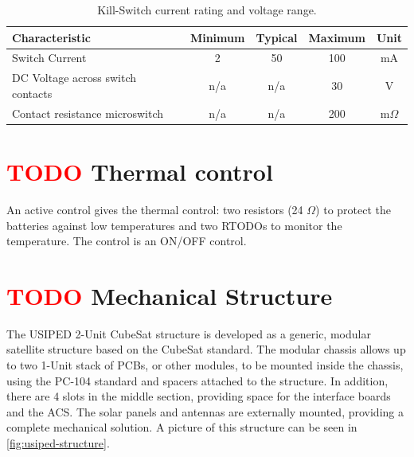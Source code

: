 \begin{table}[!h]
    \centering
    \begin{tabular}{lcccc}
        \toprule[1.5pt]
        \textbf{Characteristic} & \textbf{Minimum} & \textbf{Typical} & \textbf{Maximum} & \textbf{Unit} \\
        \midrule
        Switch Current                      & 2     & 50    & 100   & mA \\
        DC Voltage across switch contacts   & n/a   & n/a   & 30    & V \\
        Contact resistance microswitch      & n/a   & n/a   & 200   & m$\Omega$ \\
        \bottomrule[1.5pt]
    \end{tabular}
    \caption{Kill-Switch current rating and voltage range.}
    \label{tab:kill-switch-specs}
\end{table}


\section{ \textcolor{red}{TODO} Thermal control}

An active control gives the thermal control: two resistors (24 $\Omega$) to protect the batteries against low temperatures and two RTODOs to monitor the temperature. The control is an ON/OFF control.



\section{ \textcolor{red}{TODO} Mechanical Structure}

The USIPED 2-Unit CubeSat structure is developed as a generic, modular satellite structure based on the CubeSat standard. The modular chassis allows up to two 1-Unit stack of PCBs, or other modules, to be mounted inside the chassis, using the PC-104 standard and spacers attached to the structure. In addition, there are 4 slots in the middle section, providing space for the interface boards and the ACS. The solar panels and antennas are externally mounted, providing a complete mechanical solution. A picture of this structure can be seen in \autoref{fig:usiped-structure}.

